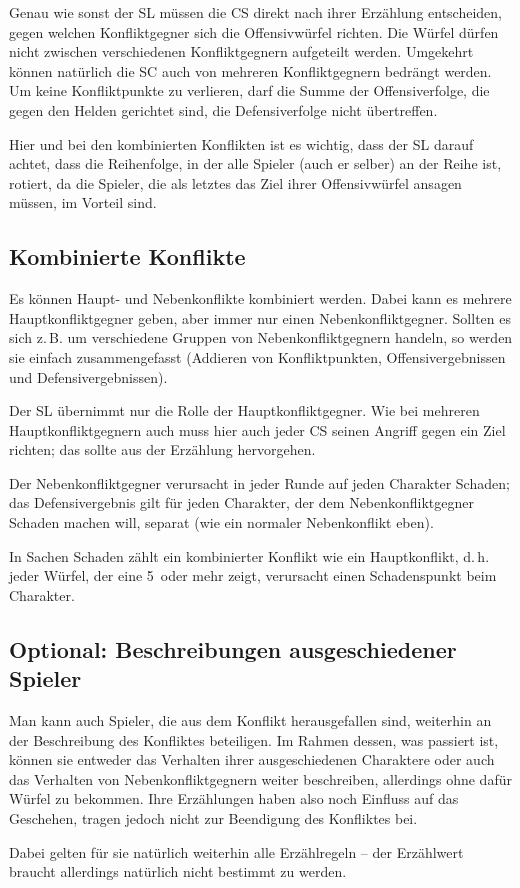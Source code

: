 Genau wie sonst der SL müssen die CS direkt nach ihrer Erzählung entscheiden, gegen welchen Konfliktgegner sich die Offensivwürfel richten. Die Würfel dürfen nicht zwischen verschiedenen Konfliktgegnern aufgeteilt werden. Umgekehrt können natürlich die SC auch von mehreren Konfliktgegnern bedrängt werden. Um keine Konfliktpunkte zu verlieren, darf die Summe der Offensiverfolge, die gegen den Helden gerichtet sind, die Defensiverfolge nicht übertreffen.

Hier und bei den kombinierten Konflikten ist es wichtig, dass der SL darauf achtet, dass die Reihenfolge, in der alle Spieler (auch er selber) an der Reihe ist, rotiert, da die Spieler, die als letztes das Ziel ihrer Offensivwürfel ansagen müssen, im Vorteil sind.

\subsection{Kombinierte Konflikte}
Es können Haupt- und Nebenkonflikte kombiniert werden. Dabei kann es mehrere Hauptkonfliktgegner geben, aber immer nur einen Nebenkonfliktgegner. Sollten es sich z.\,B. um verschiedene Gruppen von Nebenkonfliktgegnern handeln, so werden sie einfach zusammengefasst (Addieren von Konfliktpunkten, Offensivergebnissen und Defensivergebnissen).

Der SL übernimmt nur die Rolle der Hauptkonfliktgegner. Wie bei mehreren Hauptkonfliktgegnern auch muss hier auch jeder CS seinen Angriff gegen ein Ziel richten; das sollte aus der Erzählung hervorgehen.

Der Nebenkonfliktgegner verursacht in jeder Runde auf jeden Charakter Schaden; das Defensivergebnis gilt für jeden Charakter, der dem Nebenkonfliktgegner Schaden machen will, separat (wie ein normaler Nebenkonflikt eben).

In Sachen Schaden zählt ein kombinierter Konflikt wie ein Hauptkonflikt, d.\,h. jeder Würfel, der eine 5~oder mehr zeigt, verursacht einen Schadenspunkt beim Charakter.

\begin{optional}
\section{Optional: Beschreibungen ausgeschiedener Spieler}

Man kann auch Spieler, die aus dem Konflikt herausgefallen sind, weiterhin an der Beschreibung des Konfliktes beteiligen. Im Rahmen dessen, was passiert ist, können sie entweder das Verhalten ihrer ausgeschiedenen Charaktere oder auch das Verhalten von Nebenkonfliktgegnern weiter beschreiben, allerdings ohne dafür Würfel zu bekommen. Ihre Erzählungen haben also noch Einfluss auf das Geschehen, tragen jedoch nicht zur Beendigung des Konfliktes bei.

Dabei gelten für sie natürlich weiterhin alle Erzählregeln -- der Erzählwert braucht allerdings natürlich nicht bestimmt zu werden.
\end{optional}

